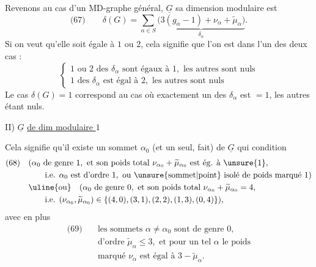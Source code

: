 Revenons au cas d'un MD-graphe général, $\underline G$ sa dimension modulaire est
\[
\text{(67)}\qquad\delta(G)=\sum_{\alpha\in S}\underbrace{\bigl(3(g_\alpha-1)+\nu_\alpha+\widetilde\mu_\alpha\bigr)}_{\delta_\alpha}.
\]
Si on veut qu'elle soit égale à $1$ ou $2$, cela signifie que l'on est dans l'un des deux cas :
\[
\left\{\begin{array}{l}
1\text{ ou }2\text{ des }\delta_\alpha\text{ sont égaux à }1,\text{ les autres sont nuls}\\
1\text{ des }\delta_\alpha\text{ est égal à }2,\text{ les autres sont nuls}
\end{array}\right.
\]
Le cas $\delta(G)=1$ correspond au cas où exactement un des $\delta_\alpha$ est $=1$, les autres étant nuls.

II) $\underline G$ \uline{de dim modulaire $1$}

Cela signifie qu'il existe un sommet $\alpha_0$ (et un seul,  fait) de $\underline G$ qui   condition
\[
\begin{aligned}
\text{(68)}\quad &(\alpha_0\text{ de genre }1,\text{ et son poids total }\nu_{\alpha_0}+\widetilde\mu_{\alpha_0}\text{ est ég. à }\unsure{1},\\
&\qquad\text{i.e. }\alpha_0\text{ est d'ordre }1,\text{ ou \unsure{sommet|point} isolé de poids marqué }1)\\
&\uline{\text{ou}}\quad(\alpha_0\text{ de genre }0,\text{ et son poids total }\nu_{\alpha_0}+\widetilde\mu_{\alpha_0}=4,\\
&\qquad\text{i.e. }(\nu_{\alpha_0},\widetilde\mu_{\alpha_0})\in\{(4,0),(3,1),(2,2),(1,3),(0,4)\}),
\end{aligned}
\]
avec en plus
\[
\begin{aligned}
\text{(69)}\quad&\text{les sommets }\alpha\ne\alpha_0\text{ sont de genre }0,\\
&\text{d'ordre }\widetilde\mu_\alpha\leq3,\text{ et pour un tel }\alpha\text{ le poids}\\
&\text{marqué }\nu_\alpha\text{ est égal à }3-\widetilde\mu_\alpha.
\end{aligned}
\]
